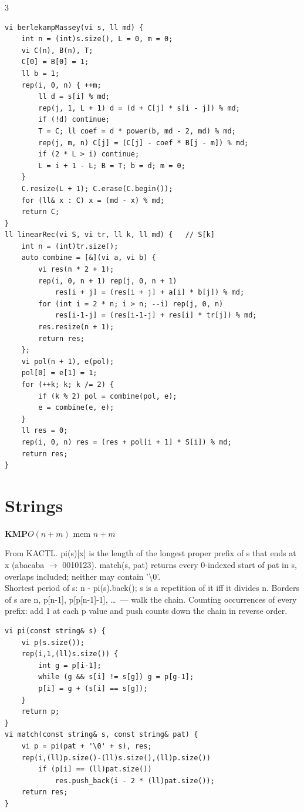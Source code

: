 \documentclass[9pt,a4paper]{extarticle}
\newcommand{\entry}[3]{%
  \addcontentsline{toc}{subsection}{#1}%
  \vspace{0.8ex}%
  \noindent\colorbox{hdbg}{\parbox{\dimexpr\columnwidth-2\fboxsep}{%
    \strut\textbf{#1}\hfill{\footnotesize\textsf{#2}}}}\par
  \vspace{0.4ex}%
  {\footnotesize #3\par}%
}
\newcommand{\code}[1]{{\ttfamily\small #1}}
\begin{document}
\begin{multicols*}{3}
\begin{lstlisting}
vi berlekampMassey(vi s, ll md) {
    int n = (int)s.size(), L = 0, m = 0;
    vi C(n), B(n), T;
    C[0] = B[0] = 1;
    ll b = 1;
    rep(i, 0, n) { ++m;
        ll d = s[i] % md;
        rep(j, 1, L + 1) d = (d + C[j] * s[i - j]) % md;
        if (!d) continue;
        T = C; ll coef = d * power(b, md - 2, md) % md;
        rep(j, m, n) C[j] = (C[j] - coef * B[j - m]) % md;
        if (2 * L > i) continue;
        L = i + 1 - L; B = T; b = d; m = 0;
    }
    C.resize(L + 1); C.erase(C.begin());
    for (ll& x : C) x = (md - x) % md;
    return C;
}
ll linearRec(vi S, vi tr, ll k, ll md) {   // S[k]
    int n = (int)tr.size();
    auto combine = [&](vi a, vi b) {
        vi res(n * 2 + 1);
        rep(i, 0, n + 1) rep(j, 0, n + 1)
            res[i + j] = (res[i + j] + a[i] * b[j]) % md;
        for (int i = 2 * n; i > n; --i) rep(j, 0, n)
            res[i-1-j] = (res[i-1-j] + res[i] * tr[j]) % md;
        res.resize(n + 1);
        return res;
    };
    vi pol(n + 1), e(pol);
    pol[0] = e[1] = 1;
    for (++k; k; k /= 2) {
        if (k % 2) pol = combine(pol, e);
        e = combine(e, e);
    }
    ll res = 0;
    rep(i, 0, n) res = (res + pol[i + 1] * S[i]) % md;
    return res;
}
\end{lstlisting}

\section{Strings}

\entry{KMP}{$O(n + m)$ \quad mem $n + m$}{%
From KACTL. \code{pi(s)[x]} is the length of the longest proper prefix of \code{s} that
ends at \code{x} (abacaba $\to$ 0010123). \code{match(s, pat)} returns every 0-indexed
start of \code{pat} in \code{s}, overlaps included; neither may contain
\code{'\textbackslash0'}.\\[0.3ex]
Shortest period of \code{s}: \code{n - pi(s).back()}; \code{s} is a repetition of it iff
it divides \code{n}. Borders of \code{s} are \code{n}, \code{p[n-1]},
\code{p[p[n-1]-1]}, \dots\ --- walk the chain. Counting occurrences of every prefix: add
1 at each \code{p} value and push counts down the chain in reverse order.}

\begin{lstlisting}
vi pi(const string& s) {
    vi p(s.size());
    rep(i,1,(ll)s.size()) {
        int g = p[i-1];
        while (g && s[i] != s[g]) g = p[g-1];
        p[i] = g + (s[i] == s[g]);
    }
    return p;
}
vi match(const string& s, const string& pat) {
    vi p = pi(pat + '\0' + s), res;
    rep(i,(ll)p.size()-(ll)s.size(),(ll)p.size())
        if (p[i] == (ll)pat.size())
            res.push_back(i - 2 * (ll)pat.size());
    return res;
}
\end{lstlisting}


\end{multicols*}
\end{document}
